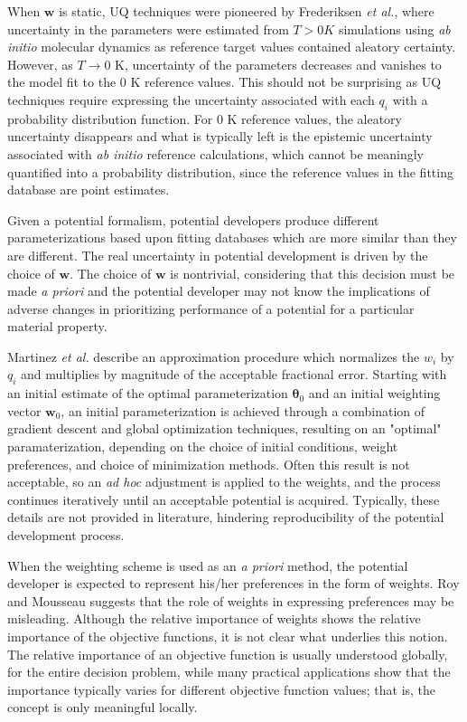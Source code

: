When $\bm{w}$ is static, UQ techniques were pioneered by Frederiksen \emph{et al.}\cite{frederiksen2004_md_bayes}, where uncertainty in the parameters were estimated from $T > 0K$ simulations using \emph{ab initio} molecular dynamics as reference target values contained aleatory certainty.  However, as $T \rightarrow 0 $ K, uncertainty of the parameters decreases and vanishes to the model fit to the $0$ K reference values.  This should not be surprising as UQ techniques require expressing the uncertainty associated with each $q_i$ with a probability distribution function.  For $0$ K reference values, the aleatory uncertainty disappears and what is typically left is the epistemic uncertainty associated with \emph{ab initio} reference calculations, which cannot be meaningly quantified into a probability distribution, since the reference values in the fitting database are point estimates.

Given a potential formalism, potential developers produce different parameterizations based upon fitting databases which are more similar than they are different.  The real uncertainty in potential development is driven by the choice of $\bm{w}$.  The choice of $\bm{w}$ is nontrivial, considering that this decision must be made \emph{a priori} and the potential developer may not know the implications of adverse changes in prioritizing performance of a potential for a particular material property.

Martinez \emph{et al.}\cite{martinez2013_fitting,martinez2016_posmat} describe an approximation procedure which normalizes the $w_i$ by $q_i$ and multiplies by magnitude of the acceptable fractional error.  Starting with an initial estimate of the optimal parameterization $\bm{\theta}_0$ and an initial weighting vector $\bm{w}_0$, an initial parameterization is achieved through a combination of gradient descent and global optimization techniques, resulting on an "optimal" paramaterization, depending on the choice of initial conditions, weight preferences, and choice of minimization methods.  Often this result is not acceptable, so an \emph{ad hoc} adjustment is applied to the weights, and the process continues iteratively until an acceptable potential is acquired.  Typically, these details are not provided in literature, hindering reproducibility of the potential development process.

When the weighting scheme is used as an \emph{a priori} method, the potential developer is expected to represent his/her preferences in the form of weights.  Roy and Mousseau\cite{roy1996_moo_weights} suggests that the role of weights in expressing preferences may be misleading.  Although the relative importance of weights shows the relative importance of the objective functions, it is not clear what underlies this notion.  The relative importance of an objective function is usually understood globally, for the entire decision problem, while many practical applications show that the importance typically varies for different objective function values; that is, the concept is only meaningful locally\cite{podinovski2002_moo_weights}.

